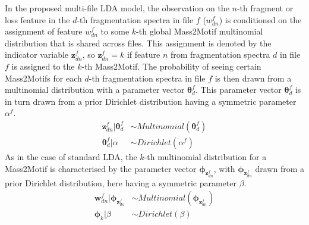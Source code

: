 In the proposed multi-file LDA model, the observation on the $n$-th fragment or loss feature in the $d$-th fragmentation spectra in file $f$ ($w_{dn}^f$) is conditioned on the assignment of feature $w_{dn}^f$ to some $k$-th global Mass2Motif multinomial distribution that is shared across files. This assignment is denoted by the indicator variable $\boldsymbol{z}_{dn}^f$, so $\boldsymbol{z}_{dn}^f=k$ if feature $n$ from fragmentation spectra $d$ in file $f$ is assigned to the $k$-th Mass2Motif. The probability of seeing certain Mass2Motifs for each $d$-th fragmentation spectra in file $f$ is then drawn from a multinomial distribution with a parameter vector $\boldsymbol{\theta}_{d}^f$. This parameter vector $\boldsymbol{\theta}_{d}^f$ is in turn drawn from a prior Dirichlet distribution having a symmetric parameter $\alpha^f$. 
\begin{align}
\boldsymbol{z}_{dn}^f \vert \boldsymbol{\theta}_{d}^f &\sim Multinomial(\boldsymbol{\theta}_{d}^f) \label{eq:dir-multi-1a}\\
\boldsymbol{\theta}_{d}^f \vert \alpha &\sim Dirichlet(\alpha^f) \label{eq:dir-multi-1b}
\end{align}
As in the case of standard LDA, the $k$-th multinomial distribution for a Mass2Motif is characterised by the parameter vector $\boldsymbol{\phi}_{\boldsymbol{z}_{dn}^f}$, with $\boldsymbol{\phi}_{\boldsymbol{z}_{dn}^f}$ drawn from a prior Dirichlet distribution, here having a symmetric parameter $\beta$. 
\begin{align}
\boldsymbol{w}_{dn}^f \vert \boldsymbol{\phi}_{\boldsymbol{z}_{dn}^f} &\sim Multinomial(\boldsymbol{\phi}_{\boldsymbol{z}_{dn}^f}) \label{eq:dir-multi-2a} \\
\boldsymbol{\phi}_{k} \vert \beta &\sim Dirichlet(\beta) \label{eq:dir-multi-2b}
\end{align}

